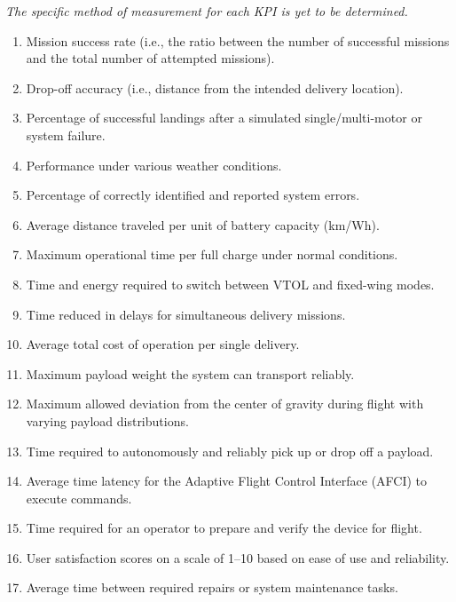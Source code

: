 \documentclass[12pt]{article}
\begin{document}
\textit{The specific method of measurement for each KPI is yet to be determined.}
\begin{enumerate}
    \item Mission success rate (i.e., the ratio between the number of successful missions and the total number of attempted missions).
    \item Drop-off accuracy (i.e., distance from the intended delivery location).
    \item Percentage of successful landings after a simulated single/multi-motor or system failure.
    \item Performance under various weather conditions.
    \item Percentage of correctly identified and reported system errors.

    \item Average distance traveled per unit of battery capacity (km/Wh).
    \item Maximum operational time per full charge under normal conditions.
    \item Time and energy required to switch between VTOL and fixed-wing modes.
    \item Time reduced in delays for simultaneous delivery missions.
    \item Average total cost of operation per single delivery.

    \item Maximum payload weight the system can transport reliably.
    \item Maximum allowed deviation from the center of gravity during flight with varying payload distributions.
    \item Time required to autonomously and reliably pick up or drop off a payload.

    \item Average time latency for the Adaptive Flight Control Interface (AFCI) to execute commands.
    \item Time required for an operator to prepare and verify the device for flight.
    \item User satisfaction scores on a scale of 1–10 based on ease of use and reliability.

    \item Average time between required repairs or system maintenance tasks.
\end{enumerate}
\end{document}
